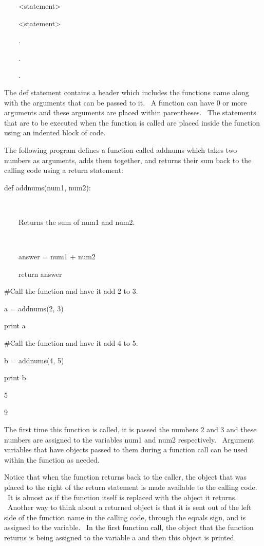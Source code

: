 \documentclass[12pt,twoside]{book}
\begin{document}
\ \ \ \ {\textless}statement{\textgreater}

\ \ \ \ {\textless}statement{\textgreater}

\ \ \ \ .

\ \ \ \ .

\ \ \ \ .


\bigskip

The def statement contains a header which includes the function{\textquotesingle}s name along with the arguments that can be passed to it. \ A function can have 0 or more arguments and these arguments are placed within parentheses. \ The statements that are to be executed when the function is called are placed inside the function using an indented block of code. \ 


\bigskip

The following program defines a function called addnums which takes two numbers as arguments, adds them together, and returns their sum back to the calling code using a return statement: 

\bigskip

def addnums(num1, num2):

\ \ \ \ {\textquotedbl}{\textquotedbl}{\textquotedbl}

\ \ \ \ Returns the sum of num1 and num2.

\ \ \ \ {\textquotedbl}{\textquotedbl}{\textquotedbl}

\ \ \ \ answer = num1 + num2

\ \ \ \ return answer


\bigskip

\#Call the function and have it add 2 to 3.

a = addnums(2, 3)

print a



\#Call the function and have it add 4 to 5.

b = addnums(4, 5)

print b

{\textbar}

5

9

The first time this function is called, it is passed the numbers 2 and 3 and these numbers are assigned to the variables num1 and num2 respectively. \ Argument variables that have objects passed to them during a function call can be used within the function as needed. 

\bigskip

Notice that when the function returns back to the caller, the object that was placed to the right of the return statement is made available to the calling code. \ It is almost as if the function itself is replaced with the object it returns. \ Another way to think about a returned object is that it is sent out of the left side of the function name in the calling code, through the equals sign, and is assigned to the variable. \ In the first function call, the object that the function returns is being assigned to the variable {\textquotesingle}a{\textquotesingle} and then this object is printed. 
\end{document}
